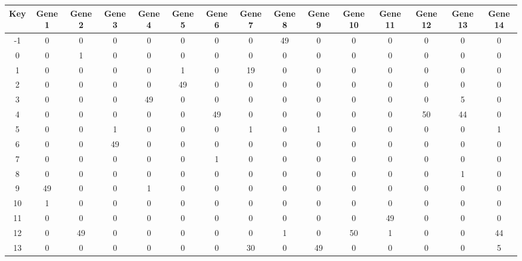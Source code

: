 \begin{tabular}{|c|c|c|c|c|c|c|c|c|c|c|c|c|c|c|}
\hline
Key & Gene 1 & Gene 2 & Gene 3 & Gene 4 & Gene 5 & Gene 6 & Gene 7 & Gene 8 & Gene 9 & Gene 10 & Gene 11 & Gene 12 & Gene 13 & Gene 14 \\
\hline
-1 & 0 & 0 & 0 & 0 & 0 & 0 & 0 & 49 & 0 & 0 & 0 & 0 & 0 & 0 \\
0 & 0 & 1 & 0 & 0 & 0 & 0 & 0 & 0 & 0 & 0 & 0 & 0 & 0 & 0 \\
1 & 0 & 0 & 0 & 0 & 1 & 0 & 19 & 0 & 0 & 0 & 0 & 0 & 0 & 0 \\
2 & 0 & 0 & 0 & 0 & 49 & 0 & 0 & 0 & 0 & 0 & 0 & 0 & 0 & 0 \\
3 & 0 & 0 & 0 & 49 & 0 & 0 & 0 & 0 & 0 & 0 & 0 & 0 & 5 & 0 \\
4 & 0 & 0 & 0 & 0 & 0 & 49 & 0 & 0 & 0 & 0 & 0 & 50 & 44 & 0 \\
5 & 0 & 0 & 1 & 0 & 0 & 0 & 1 & 0 & 1 & 0 & 0 & 0 & 0 & 1 \\
6 & 0 & 0 & 49 & 0 & 0 & 0 & 0 & 0 & 0 & 0 & 0 & 0 & 0 & 0 \\
7 & 0 & 0 & 0 & 0 & 0 & 1 & 0 & 0 & 0 & 0 & 0 & 0 & 0 & 0 \\
8 & 0 & 0 & 0 & 0 & 0 & 0 & 0 & 0 & 0 & 0 & 0 & 0 & 1 & 0 \\
9 & 49 & 0 & 0 & 1 & 0 & 0 & 0 & 0 & 0 & 0 & 0 & 0 & 0 & 0 \\
10 & 1 & 0 & 0 & 0 & 0 & 0 & 0 & 0 & 0 & 0 & 0 & 0 & 0 & 0 \\
11 & 0 & 0 & 0 & 0 & 0 & 0 & 0 & 0 & 0 & 0 & 49 & 0 & 0 & 0 \\
12 & 0 & 49 & 0 & 0 & 0 & 0 & 0 & 1 & 0 & 50 & 1 & 0 & 0 & 44 \\
13 & 0 & 0 & 0 & 0 & 0 & 0 & 30 & 0 & 49 & 0 & 0 & 0 & 0 & 5 \\
\hline
\end{tabular}